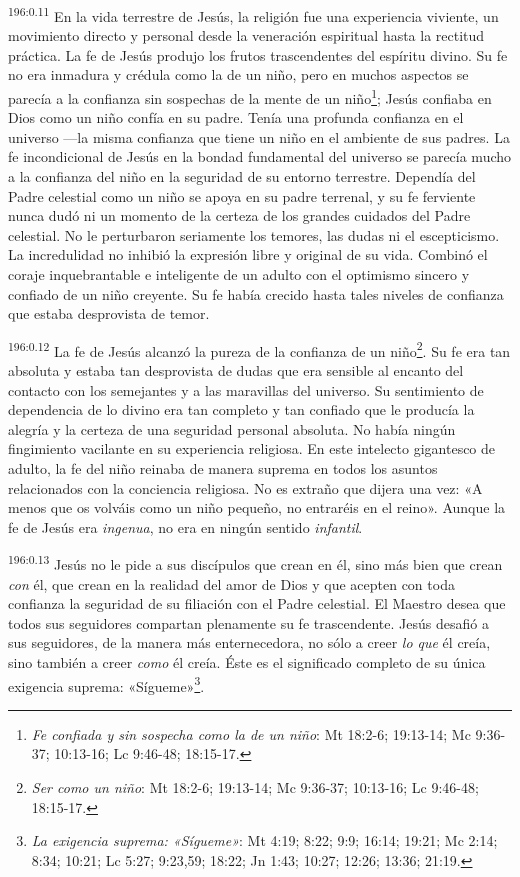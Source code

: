 \par
\textsuperscript{196:0.11} En la vida terrestre de Jesús, la religión fue una experiencia viviente, un movimiento directo y personal desde la veneración espiritual hasta la rectitud práctica. La fe de Jesús produjo los frutos trascendentes del espíritu divino. Su fe no era inmadura y crédula como la de un niño, pero en muchos aspectos se parecía a la confianza sin sospechas de la mente de un niño\footnote{\textit{Fe confiada y sin sospecha como la de un niño}: Mt 18:2-6; 19:13-14; Mc 9:36-37; 10:13-16; Lc 9:46-48; 18:15-17.}; Jesús confiaba en Dios como un niño confía en su padre. Tenía una profunda confianza en el universo ---la misma confianza que tiene un niño en el ambiente de sus padres. La fe incondicional de Jesús en la bondad fundamental del universo se parecía mucho a la confianza del niño en la seguridad de su entorno terrestre. Dependía del Padre celestial como un niño se apoya en su padre terrenal, y su fe ferviente nunca dudó ni un momento de la certeza de los grandes cuidados del Padre celestial. No le perturbaron seriamente los temores, las dudas ni el escepticismo. La incredulidad no inhibió la expresión libre y original de su vida. Combinó el coraje inquebrantable e inteligente de un adulto con el optimismo sincero y confiado de un niño creyente. Su fe había crecido hasta tales niveles de confianza que estaba desprovista de temor.

\par
\textsuperscript{196:0.12} La fe de Jesús alcanzó la pureza de la confianza de un niño\footnote{\textit{Ser como un niño}: Mt 18:2-6; 19:13-14; Mc 9:36-37; 10:13-16; Lc 9:46-48; 18:15-17.}. Su fe era tan absoluta y estaba tan desprovista de dudas que era sensible al encanto del contacto con los semejantes y a las maravillas del universo. Su sentimiento de dependencia de lo divino era tan completo y tan confiado que le producía la alegría y la certeza de una seguridad personal absoluta. No había ningún fingimiento vacilante en su experiencia religiosa. En este intelecto gigantesco de adulto, la fe del niño reinaba de manera suprema en todos los asuntos relacionados con la conciencia religiosa. No es extraño que dijera una vez: «A menos que os volváis como un niño pequeño, no entraréis en el reino». Aunque la fe de Jesús era \textit{ingenua}, no era en ningún sentido \textit{infantil}.

\par
\textsuperscript{196:0.13} Jesús no le pide a sus discípulos que crean en él, sino más bien que crean \textit{con} él, que crean en la realidad del amor de Dios y que acepten con toda confianza la seguridad de su filiación con el Padre celestial. El Maestro desea que todos sus seguidores compartan plenamente su fe trascendente. Jesús desafió a sus seguidores, de la manera más enternecedora, no sólo a creer \textit{lo que} él creía, sino también a creer \textit{como} él creía. Éste es el significado completo de su única exigencia suprema: «Sígueme»\footnote{\textit{La exigencia suprema: «Sígueme»}: Mt 4:19; 8:22; 9:9; 16:14; 19:21; Mc 2:14; 8:34; 10:21; Lc 5:27; 9:23,59; 18:22; Jn 1:43; 10:27; 12:26; 13:36; 21:19.}.

